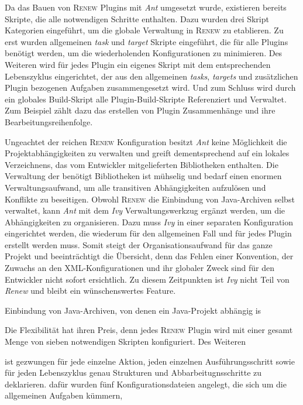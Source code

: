 		Da das Bauen von \textsc{Renew} Plugins mit \textit{Ant} umgesetzt wurde, existieren bereits Skripte, die alle notwendigen Schritte enthalten. Dazu wurden drei Skript Kategorien eingeführt, um die globale Verwaltung in \textsc{Renew} zu etablieren. Zu erst wurden allgemeinen \textit{task} und \textit{target} Skripte eingeführt, die für alle Plugins benötigt werden, um die wiederholenden Konfigurationen zu minimieren. Des Weiteren wird für jedes Plugin ein eigenes Skript mit dem entsprechenden Lebenszyklus eingerichtet, der aus den allgemeinen \textit{tasks}, \textit{targets} und zusätzlichen Plugin bezogenen Aufgaben zusammengesetzt wird. Und zum Schluss wird durch ein globales Build-Skript alle Plugin-Build-Skripte Referenziert und Verwaltet. Zum Beispiel zählt dazu das erstellen von Plugin Zusammenhänge und ihre Bearbeitungsreihenfolge.\bigbreak

		Ungeachtet der reichen \textsc{Renew} Konfiguration besitzt \textit{Ant} keine Möglichkeit die Projektabhängigkeiten zu verwalten und greift dementsprechend auf ein lokales Verzeichnens, das vom Entwickler mitgelieferten Bibliotheken enthalten. Die Verwaltung der benötigt Bibliotheken ist mühselig und bedarf einen enormen Verwaltungsaufwand, um alle transitiven Abhängigkeiten aufzulösen und Konflikte zu beseitigen. Obwohl \textsc{Renew} die Einbindung von Java-Archiven selbst verwaltet, kann \textit{Ant} mit dem \textit{Ivy} Verwaltungswerkzug ergänzt werden, um die Abhängigkeiten zu organisieren. Dazu muss \textit{Ivy} in einer separaten Konfiguration eingerichtet werden, die wiederum für den allgemeinen Fall und für jedes Plugin erstellt werden muss. Somit steigt der Organisationsaufwand für das ganze Projekt und beeinträchtigt die Übersicht, denn das Fehlen einer Konvention, der Zuwachs an den XML-Konfigurationen und ihr globaler Zweck sind für den Entwickler nicht sofort ersichtlich.\newline
		Zu diesem Zeitpunkten ist \textit{Ivy} nicht Teil von \textit{Renew} und bleibt ein wünschenswertes Feature.



Einbindung von Java-Archiven, von denen ein Java-Projekt abhängig is

		Die Flexibilität hat ihren Preis, denn jedes \textsc{Renew} Plugin wird mit einer gesamt Menge von sieben notwendigen Skripten konfiguriert. Des Weiteren 



		ist gezwungen für jede einzelne Aktion, jeden einzelnen Ausführungsschritt sowie für jeden Lebenszyklus genau Strukturen und Abbarbeitugnsschritte zu deklarieren. dafür wurden fünf Konfigurationsdateien angelegt, die sich um die allgemeinen Aufgaben kümmern, 


